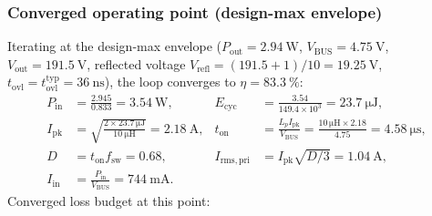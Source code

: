 \subsubsection{Converged operating point (design-max envelope)}\label{sec:hv-op-converge}

Iterating at the design-max envelope ($P_{\mathrm{out}} = \SI{2.94}{\watt}$,
$V_{\mathrm{BUS}} = \SI{4.75}{\volt}$, $V_{\mathrm{out}} = \SI{191.5}{\volt}$,
reflected voltage $V_{\mathrm{refl}} = (191.5+1)/10 = \SI{19.25}{\volt}$,
$t_{\mathrm{ovl}} = t_{\mathrm{ovl}}^{\mathrm{typ}} = \SI{36}{\nano\second}$),
the loop converges to $\eta = \SI{83.3}{\percent}$:
\begin{align*}
  P_{\mathrm{in}} &= \frac{2.945}{0.833} = \SI{3.54}{\watt}, &
  E_{\mathrm{cyc}} &= \frac{3.54}{149.4\times10^{3}} = \SI{23.7}{\micro\joule},\\
  I_{\mathrm{pk}} &= \sqrt{\frac{2 \times 23.7\,\si{\micro\joule}}
  {\SI{10}{\micro\henry}}} = \SI{2.18}{\ampere}, &
  t_{\mathrm{on}} &= \frac{L_p I_{\mathrm{pk}}}{V_{\mathrm{BUS}}}
                   = \frac{10\,\si{\micro\henry} \times 2.18}{4.75}
                   = \SI{4.58}{\micro\second},\\
                   D &= t_{\mathrm{on}} f_{\mathrm{sw}} = 0.68, &
                   I_{\mathrm{rms,pri}} &= I_{\mathrm{pk}}\sqrt{D/3} = \SI{1.04}{\ampere},\\
                   I_{\mathrm{in}} &= \frac{P_{\mathrm{in}}}{V_{\mathrm{BUS}}}
                   = \SI{744}{\milli\ampere}.
\end{align*}
Converged loss budget at this point:

